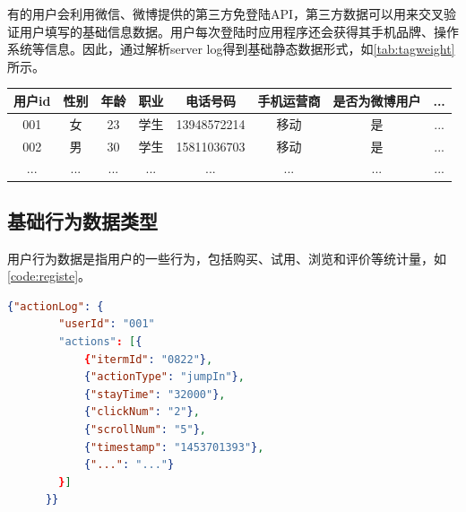 \label{chap:example}
\begin{figure}
\centering
  \label{pic:hl_userProfile}
\end{figure}
有的用户会利用微信、微博提供的第三方免登陆API，第三方数据可以用来交叉验证用户填写的基础信息数据。用户每次登陆时应用程序还会获得其手机品牌、操作系统等信息。因此，通过解析server log得到基础静态数据形式，如\autoref{tab:tagweight}所示。
  \begin{table}[htp]
  \centering
  \label{tab:tagweight}
  \begin{tabular}{|c|c|c|c|c|c|c|c|} \hline
   用户id & 性别 & 年龄 & 职业 & 电话号码 & 手机运营商 & 是否为微博用户 & ... \\ \hline
   001 & 女 & 23 & 学生 & 13948572214 & 移动 & 是 & ... \\ \hline
   002 & 男 & 30 & 学生 & 15811036703 & 移动 & 是 & ... \\ \hline
   ... & ... & ... & ... & ... & ... & ... & ... \\ \hline
  \end{tabular}
  \end{table}

  \subsection{基础行为数据类型}
  用户行为数据是指用户的一些行为，包括购买、试用、浏览和评价等统计量，如\autoref{code:registe}。
    \begin{lstlisting}[language=json,firstnumber=1,label={code:registe}, caption={基础行为数据类型}]
      {"actionLog": {
        "userId": "001"
        "actions": [{
            {"itermId": "0822"},
            {"actionType": "jumpIn"},
            {"stayTime": "32000"},
            {"clickNum": "2"},
            {"scrollNum": "5"},
            {"timestamp": "1453701393"},
            {"...": "..."}
        }]
      }}
    \end{lstlisting}

